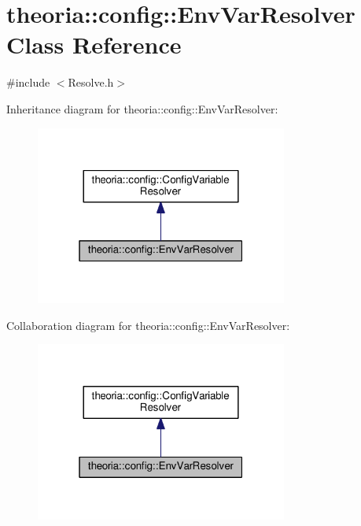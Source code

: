 \hypertarget{classtheoria_1_1config_1_1EnvVarResolver}{}\section{theoria\+:\+:config\+:\+:Env\+Var\+Resolver Class Reference}
\label{classtheoria_1_1config_1_1EnvVarResolver}


{\ttfamily \#include $<$Resolve.\+h$>$}



Inheritance diagram for theoria\+:\+:config\+:\+:Env\+Var\+Resolver\+:\nopagebreak
\begin{figure}[H]
\begin{center}
\leavevmode
\includegraphics[width=235pt]{classtheoria_1_1config_1_1EnvVarResolver__inherit__graph}
\end{center}
\end{figure}


Collaboration diagram for theoria\+:\+:config\+:\+:Env\+Var\+Resolver\+:\nopagebreak
\begin{figure}[H]
\begin{center}
\leavevmode
\includegraphics[width=235pt]{classtheoria_1_1config_1_1EnvVarResolver__coll__graph}
\end{center}
\end{figure}
